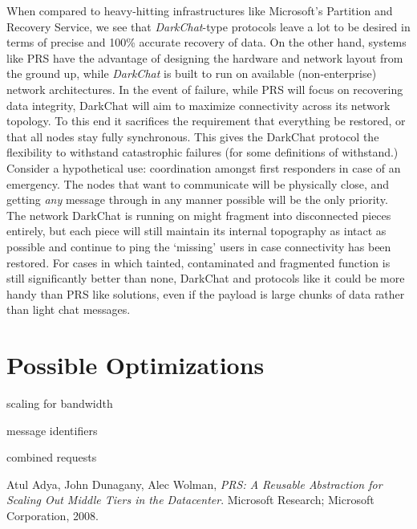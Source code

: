 \documentclass[11pt]{article}
\begin{document}
When compared to heavy-hitting infrastructures like Microsoft's Partition and Recovery Service, we see that \emph{DarkChat}-type protocols leave a lot to be desired in terms of precise and 100\% accurate recovery of data. On the other hand, systems like PRS have the advantage of designing the hardware and network layout from the ground up, while \emph{DarkChat} is built to run on available (non-enterprise) network architectures. In the event of failure, while PRS will focus on recovering data integrity, DarkChat will aim to maximize connectivity across its network topology. To this end it sacrifices the requirement that everything be restored, or that all nodes stay fully synchronous. This gives the DarkChat protocol the flexibility to withstand catastrophic failures (for some definitions of withstand.) Consider a hypothetical use: coordination amongst first responders in case of an emergency. The nodes that want to communicate will be physically close, and getting \emph{any} message through in any manner possible will be the only priority. The network DarkChat is running on might fragment into disconnected pieces entirely, but each piece will still maintain its internal topography as intact as possible and continue to ping the `missing' users in case connectivity has been restored. For cases in which tainted, contaminated and fragmented function is still significantly better than none, DarkChat and protocols like it could be more handy than PRS like solutions, even if the payload is large chunks of data rather than light chat messages.

\section{Possible Optimizations}
scaling for bandwidth
   
message identifiers
   
combined requests

   
\begin{thebibliography}{1}

    Atul Adya, John Dunagany, Alec Wolman,
    \emph{PRS: A Reusable Abstraction for Scaling Out Middle Tiers in the Datacenter}.
    Microsoft Research; Microsoft Corporation,
    2008.
\end{thebibliography}
\end{document}
